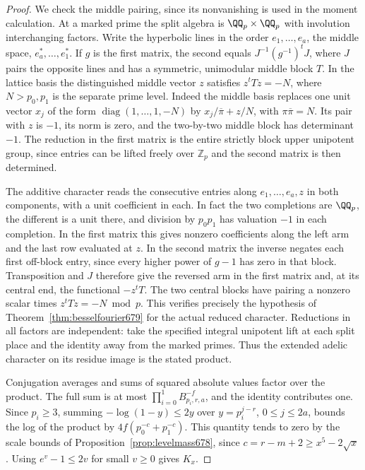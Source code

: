 \documentclass[a4paper,11pt]{article}
\theoremstyle{definition}
\theoremstyle{remark}
\newcommand{\ZZ}{\mathbb Z}\newcommand{\ord}{\operatorname{ord}}
\numberwithin{equation}{section}
\begin{document}
\begin{proof}
We check the middle pairing, since its nonvanishing is used
in the moment calculation. At a marked prime the split algebra
is \(\QQ_p\times\QQ_p\) with involution interchanging factors.
Write the hyperbolic lines in the order
\(e_1,\ldots,e_a\), the middle space, \(e_a^*,\ldots,e_1^*\).
If \(g\) is the first matrix, the second equals
\(J^{-1}(g^{-1})^tJ\), where \(J\) pairs the opposite lines
and has a symmetric, unimodular middle block \(T\).
In the lattice basis the distinguished middle vector \(z\)
satisfies \(z^tTz=-N\), where \(N>p_0,p_1\) is the separate
prime level. Indeed the middle basis replaces one unit vector
\(x_j\) of the form \(\operatorname{diag}(1,\ldots,1,-N)\)
by \(x_j/\overline\pi+z/N\), with \(\pi\overline\pi=N\).
Its pair with \(z\) is \(-1\), its norm is zero, and the
two-by-two middle block has determinant \(-1\).
The reduction in the first matrix is the entire strictly
block upper unipotent group, since entries can be lifted freely
over \(\ZZ_p\) and the second matrix is then determined.

The additive character reads the consecutive entries along
\(e_1,\ldots,e_a,z\) in both components, with a unit coefficient
in each. In fact the two completions are \(\QQ_p\), the
different is a unit there, and division by \(p_0p_1\) has
valuation \(-1\) in each completion. In the first matrix this
gives nonzero coefficients along the left arm and the last
row evaluated at \(z\). In the second matrix the inverse
negates each first off-block entry, since every higher power
of \(g-1\) has zero in that block. Transposition and \(J\)
therefore give the reversed arm in the first matrix and, at its
central end, the functional \(-z^tT\). The two central blocks
have pairing a nonzero scalar times \(z^tTz=-N\bmod p\).
This verifies precisely the hypothesis of
Theorem~\ref{thm:besselfourier679} for the actual reduced
character. Reductions in all factors are independent: take
the specified integral unipotent lift at each split place
and the identity away from the marked primes. Thus the
extended adelic character on its residue image is the stated
product.

Conjugation averages and sums of squared absolute values
factor over the product. The full sum is at most
\(\prod_{i=0}^1 B_{p_i,r,a}^{-f}\), and the identity contributes
one. Since \(p_i\ge3\), summing
\(-\log(1-y)\le2y\) over \(y=p_i^{j-r}\), \(0\le j\le2a\),
bounds the log of the product by
\(4f(p_0^{-c}+p_1^{-c})\). This quantity tends to zero by
the scale bounds of Proposition~\ref{prop:levelmass678},
since \(c=r-m+2\ge x^5-2\sqrt x\).
Using \(e^v-1\le2v\) for small \(v\ge0\) gives \(K_x\).


\end{proof}
\end{document}
